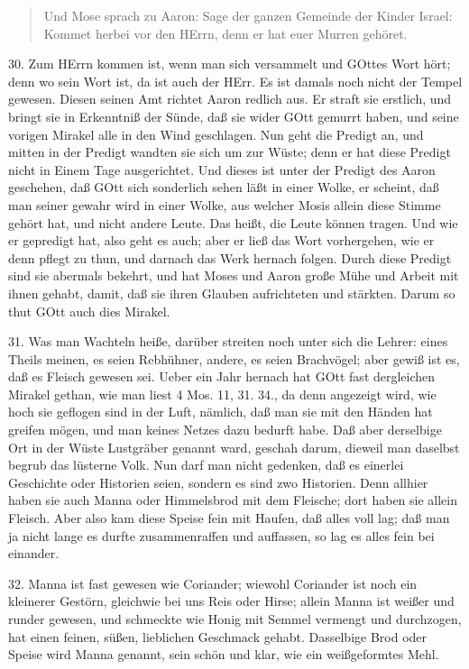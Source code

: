 \begin{quote}
Und Mose sprach zu Aaron: Sage der ganzen Gemeinde der Kinder Israel: Kommet herbei vor den HErrn, denn er hat euer Murren gehöret.
\end{quote}

30. Zum HErrn kommen ist, wenn man sich versammelt und GOttes Wort hört; denn wo sein Wort ist, da ist auch der HErr. Es ist damals noch nicht der Tempel gewesen. Diesen seinen Amt richtet Aaron redlich aus. Er straft sie erstlich, und bringt sie in Erkenntniß der Sünde, daß sie wider GOtt gemurrt haben, und seine vorigen Mirakel alle in den Wind geschlagen. Nun geht die Predigt an, und mitten in der Predigt wandten sie sich um zur Wüste; denn er hat diese Predigt nicht in Einem Tage ausgerichtet. Und dieses ist unter der Predigt des Aaron geschehen, daß GOtt sich sonderlich sehen läßt in einer Wolke, er scheint, daß man seiner gewahr wird in einer Wolke, aus welcher Mosis allein diese Stimme gehört hat, und nicht andere Leute. Das heißt, die Leute können tragen. Und wie er gepredigt hat, also geht es auch; aber er ließ das Wort vorhergehen, wie er denn pflegt zu thun, und darnach das Werk hernach folgen. Durch diese Predigt sind sie abermals bekehrt, und hat Moses und Aaron große Mühe und Arbeit mit ihnen gehabt, damit, daß sie ihren Glauben aufrichteten und stärkten. Darum so thut GOtt auch dies Mirakel.

31. Was man Wachteln heiße, darüber streiten noch unter sich die Lehrer: eines Theils meinen, es seien Rebhühner, andere, es seien Brachvögel; aber gewiß ist es, daß es Fleisch gewesen sei. Ueber ein Jahr hernach hat GOtt fast dergleichen Mirakel gethan, wie man liest 4 Mos. 11, 31. 34., da denn angezeigt wird, wie hoch sie geflogen sind in der Luft, nämlich, daß man sie mit den Händen hat greifen mögen, und man keines Netzes dazu bedurft habe. Daß aber derselbige Ort in der Wüste Lustgräber genannt ward, geschah darum, dieweil man daselbst begrub das lüsterne Volk. Nun darf man nicht gedenken, daß es einerlei Geschichte oder Historien seien, sondern es sind zwo Historien. Denn allhier haben sie auch Manna oder Himmelsbrod mit dem Fleische; dort haben sie allein Fleisch. Aber also kam diese Speise fein mit Haufen, daß alles voll lag; daß man ja nicht lange es durfte zusammenraffen und auffassen, so lag es alles fein bei einander.

32. Manna ist fast gewesen wie Coriander; wiewohl Coriander ist noch ein kleinerer Gestörn, gleichwie bei uns Reis oder Hirse; allein Manna ist weißer und runder gewesen, und schmeckte wie Honig mit Semmel vermengt und durchzogen, hat einen feinen, süßen, lieblichen Geschmack gehabt. Dasselbige Brod oder Speise wird Manna genannt, sein schön und klar, wie ein weißgeformtes Mehl.

